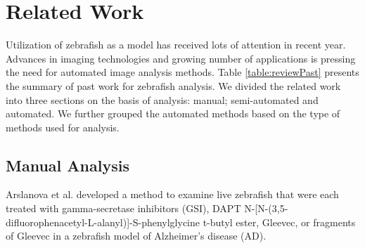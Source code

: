 \chapter{Related Work}\label{chap:RelatedWork}

Utilization of zebrafish as a model has received lots of attention in recent year. Advances in imaging technologies and growing number of applications is pressing the need for automated image analysis methods. Table \ref{table:reviewPast} presents the summary of past work for zebrafish analysis. We divided the related work into three sections on the basis of analysis: manual; semi-automated and automated. We further grouped the automated methods based on the type of methods used for analysis.

\section{Manual Analysis}

Arslanova et al. \cite{Arslanova10} developed a method to examine live zebrafish that were each treated with gamma-secretase inhibitors (GSI), DAPT {N-[N-(3,5-difluorophenacetyl-L-alanyl)]-S-phenylglycine t-butyl ester}, Gleevec, or fragments of Gleevec in a zebrafish model of Alzheimer's disease (AD). 


